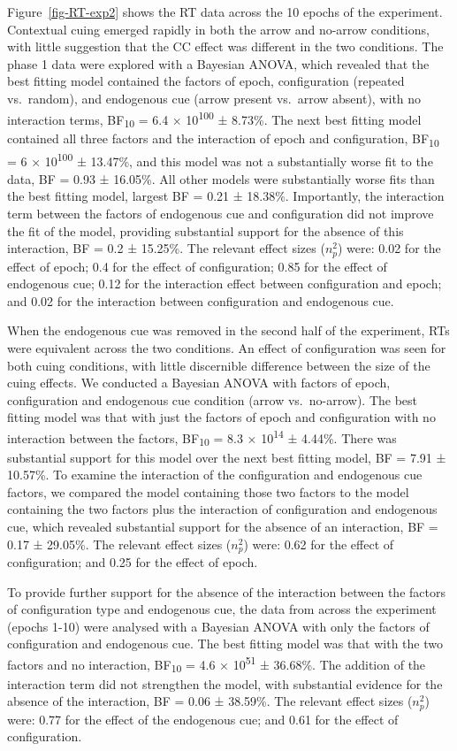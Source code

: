 \documentclass[
  man,
  floatsintext,
  longtable,
  nolmodern,
  notxfonts,
  notimes,
  colorlinks=true,linkcolor=blue,citecolor=blue,urlcolor=blue]{apa7}
\begin{document}
Figure~\ref{fig-RT-exp2} shows the RT data across the 10 epochs of the
experiment. Contextual cuing emerged rapidly in both the arrow and
no-arrow conditions, with little suggestion that the CC effect was
different in the two conditions. The phase 1 data were explored with a
Bayesian ANOVA, which revealed that the best fitting model contained the
factors of epoch, configuration (repeated vs.~random), and endogenous
cue (arrow present vs.~arrow absent), with no interaction terms,
BF\textsubscript{10} = 6.4 × 10\textsuperscript{100} ± 8.73\%. The next
best fitting model contained all three factors and the interaction of
epoch and configuration, BF\textsubscript{10} = 6 ×
10\textsuperscript{100} ± 13.47\%, and this model was not a
substantially worse fit to the data, BF = 0.93 ± 16.05\%. All other
models were substantially worse fits than the best fitting model,
largest BF = 0.21 ± 18.38\%. Importantly, the interaction term between
the factors of endogenous cue and configuration did not improve the fit
of the model, providing substantial support for the absence of this
interaction, BF = 0.2 ± 15.25\%. The relevant effect sizes (\(n^2_p\))
were: 0.02 for the effect of epoch; 0.4 for the effect of configuration;
0.85 for the effect of endogenous cue; 0.12 for the interaction effect
between configuration and epoch; and 0.02 for the interaction between
configuration and endogenous cue.

When the endogenous cue was removed in the second half of the
experiment, RTs were equivalent across the two conditions. An effect of
configuration was seen for both cuing conditions, with little
discernible difference between the size of the cuing effects. We
conducted a Bayesian ANOVA with factors of epoch, configuration and
endogenous cue condition (arrow vs.~no-arrow). The best fitting model
was that with just the factors of epoch and configuration with no
interaction between the factors, BF\textsubscript{10} = 8.3 ×
10\textsuperscript{14} ± 4.44\%. There was substantial support for this
model over the next best fitting model, BF = 7.91 ± 10.57\%. To examine
the interaction of the configuration and endogenous cue factors, we
compared the model containing those two factors to the model containing
the two factors plus the interaction of configuration and endogenous
cue, which revealed substantial support for the absence of an
interaction, BF = 0.17 ± 29.05\%. The relevant effect sizes (\(n^2_p\))
were: 0.62 for the effect of configuration; and 0.25 for the effect of
epoch.

To provide further support for the absence of the interaction between
the factors of configuration type and endogenous cue, the data from
across the experiment (epochs 1-10) were analysed with a Bayesian ANOVA
with only the factors of configuration and endogenous cue. The best
fitting model was that with the two factors and no interaction,
BF\textsubscript{10} = 4.6 × 10\textsuperscript{51} ± 36.68\%. The
addition of the interaction term did not strengthen the model, with
substantial evidence for the absence of the interaction, BF = 0.06 ±
38.59\%. The relevant effect sizes (\(n^2_p\)) were: 0.77 for the effect
of the endogenous cue; and 0.61 for the effect of configuration.
\end{document}
